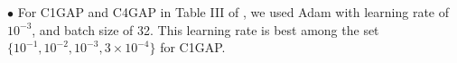 $\bullet$ For C1GAP and C4GAP in Table III of , we used Adam \citep{adam} with learning rate of $10^{-3}$, and batch size of 32. This learning rate is best among the set $\{10^{-1},10^{-2},10^{-3}, 3\times 10^{-4}\}$ for C1GAP.
\begin{comment}
\begin{figure}
\centering
\begin{minipage}{0.48\columnwidth}
\centering
\resizebox{0.99\columnwidth}{!}{

}
\end{minipage}
\begin{minipage}{0.48\columnwidth}
\centering
\resizebox{0.99\columnwidth}{!}{

}
\end{minipage}

\begin{minipage}{0.48\columnwidth}
\centering
\resizebox{0.99\columnwidth}{!}{

}
\end{minipage}
\begin{minipage}{0.48\columnwidth}
\centering
\resizebox{0.99\columnwidth}{!}{

}
\end{minipage}


\begin{minipage}{0.48\columnwidth}
\centering
\resizebox{0.99\columnwidth}{!}{

}
\end{minipage}
\begin{minipage}{0.48\columnwidth}
\centering
\resizebox{0.99\columnwidth}{!}{

}
\end{minipage}



\begin{minipage}{0.48\columnwidth}
\centering
\resizebox{0.99\columnwidth}{!}{

}
\end{minipage}
\begin{minipage}{0.48\columnwidth}
\centering
\resizebox{0.99\columnwidth}{!}{

}
\end{minipage}

\begin{minipage}{0.48\columnwidth}
\centering
\resizebox{0.99\columnwidth}{!}{

}
\end{minipage}
\begin{minipage}{0.48\columnwidth}
\centering
\resizebox{0.99\columnwidth}{!}{

}
\end{minipage}

\begin{minipage}{0.48\columnwidth}
\centering
\resizebox{0.99\columnwidth}{!}{

}
\end{minipage}
\begin{minipage}{0.48\columnwidth}
\centering
\resizebox{0.99\columnwidth}{!}{

}
\end{minipage}



\end{comment}
